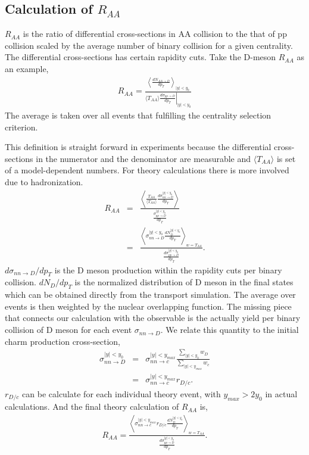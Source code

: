 \documentclass[aps, prc, reprint, amsmath, groupedaddress, nofootinbib]{revtex4-1}
\newcommand{\Raa}{R_{AA}}
\begin{document}
\begin{appendices}
\section{Calculation of $\Raa$}
$\Raa$ is the ratio of differential cross-sections in AA collision to the that of pp collision scaled by the average number of binary collision for a given centrality.
The differential cross-sections has certain rapidity cuts.
Take the D-meson $\Raa$ as an example,
\begin{eqnarray}
\Raa = \frac{\left\langle \frac{dN_{AA \rightarrow D}}{dp_T}  \right\rangle_{|y|<y_0}}{\left. \langle T_{AA}\rangle \frac{d\sigma_{pp \rightarrow D}}{dp_T}\right|_{|y|<y_0}}
\end{eqnarray}
The average is taken over all events that fulfilling the centrality selection criterion.

This definition is straight forward in experiments because the differential cross-sections in the numerator and the denominator are measurable and $\langle T_{AA}\rangle$ is set of a model-dependent numbers.
For theory calculations there is more involved due to hadronization.
\begin{eqnarray}
\Raa &=& \frac{\left\langle \frac{T_{AA}}{\langle T_{AA}\rangle} \frac{d\sigma_{n n \rightarrow D}^{|y|<y_0}}{dp_T} \right\rangle}{ \frac{\sigma_{pp \rightarrow D}^{|y|<y_0}}{dp_T}} \\
&=& \frac{\left\langle \sigma_{nn \rightarrow D}^{|y|<y_0} \frac{d N_D^{|y|<y_0}}{dp_T} \right\rangle_{w=T_{AA}}}{\frac{d\sigma_{pp \rightarrow D}^{|y|<y_0}}{dp_T}}.
\end{eqnarray}
$d\sigma_{nn \rightarrow D}/dp_T$ is the D meson production within the rapidity cuts per binary collision.
$d N_D/dp_T$ is the normalized distribution of D meson in the final states which can be obtained directly from the transport simulation.
The average over events is then weighted by the nuclear overlapping function.
The missing piece that connects our calculation with the observable is the actually yield per binary collision of D meson for each event $\sigma_{nn\rightarrow D}$.
We relate this quantity to the initial charm production cross-section,
\begin{eqnarray}
\sigma_{nn\rightarrow D}^{|y|<y_0} &=& \sigma_{nn\rightarrow c}^{|y|<y_{max}} \frac{\sum_{|y|<y_0}w_D}{\sum_{|y|<y_{max}}w_c} \\
&=&  \sigma_{nn\rightarrow c}^{|y|<y_{max}} r_{D/c}.
\end{eqnarray}
$r_{D/c}$ can be calculate for each individual theory event, with $y_{max}>2y_0$ in actual calculations.
And the final theory calculation of $\Raa$ is,
\begin{eqnarray}
\Raa = \frac{\left\langle \sigma_{nn\rightarrow c}^{|y|<y_{max}} r_{D/c} \frac{d N_D^{|y|<y_0}}{dp_T} \right\rangle_{w=T_{AA}}}{\frac{d\sigma_{pp \rightarrow D}^{|y|<y_0}}{dp_T}}.
\end{eqnarray}


\end{appendices}
\end{document}
